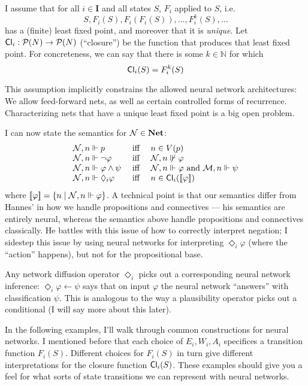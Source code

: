 \documentclass[letterpaper]{article}
\begin{document}
\begin{postulate*}
    I assume that for all $i \in \textbf{I}$ and all states $S$, $F_i$ applied to $S$, i.e.
    \[
        S, F_i(S), F_i(F_i(S)), \ldots, F^k_i(S), \ldots
    \]
    has a (finite) least fixed point, and moreover that it is \emph{unique}.  Let $\mathsf{Cl}_i : \mathcal{P}(N) \to \mathcal{P}(N)$ (``closure'') be the function that produces that least fixed point.  For concreteness, we can say that there is some $k\in \mathbb{N}$ for which
    \[
        \mathsf{Cl}_i(S) = F_i^k(S)
    \]
\end{postulate*}
This assumption implicitly constrains the allowed neural network architectures: We allow feed-forward nets, as well as certain controlled forms of recurrence.  Characterizing nets that have a unique least fixed point is a big open problem.

I can now state the semantics for $\mathcal{N} \in \textrm{\textbf{Net}}$:
\[
\begin{array}{lcl}
    \mathcal{N}, n \Vdash p & \mbox{ iff } & n \in V(p)\\
    \mathcal{N}, n \Vdash \neg \varphi & \mbox{ iff } & \mathcal{N}, n \not \Vdash \varphi\\
    \mathcal{N}, n \Vdash \varphi \land \psi & \mbox{ iff } & \mathcal{N}, n \Vdash \varphi \mbox{ and } \mathcal{M}, n \Vdash \psi\\
    \mathcal{N}, n \Vdash \Diamond_i \varphi & \mbox{ iff } & 
    n \in \mathsf{Cl}_i([\![\mbox{\em $ \varphi $\/}]\!])
\end{array}
\]
where $[\![\mbox{\em $ \varphi $\/}]\!] = \{ n \mid \mathcal{N}, n \Vdash \varphi \}$.  A technical point is that our semantics differ from Hannes' \cite{leitgeb2001nonmonotonic} in how we handle propositions and connectives --- his semantics are entirely neural, whereas the semantics above handle propositions and connectives classically.  He battles with this issue of how to correctly interpret negation; I sidestep this issue by using neural networks for interpreting $\Diamond_i \varphi$ (where the ``action'' happens), but not for the propositional base.

Any network diffusion operator $\Diamond_i$ picks out a corresponding neural network inference: $\Diamond_i \varphi \leftarrow \psi$ says that on input $\varphi$ the neural network ``answers'' with classification $\psi$.  This is analogous to the way a plausibility operator picks out a conditional (I will say more about this later).

In the following examples, I'll walk through common constructions for neural networks.  I mentioned before that each choice of $E_i, W_i, A_i$ specifices a transition function $F_i(S)$.  Different choices for $F_i(S)$ in turn give different interpretations for the closure function $\mathsf{Cl}_i(S)$.  These examples should give you a feel for what sorts of state transitions we can represent with neural networks.
\end{document}
